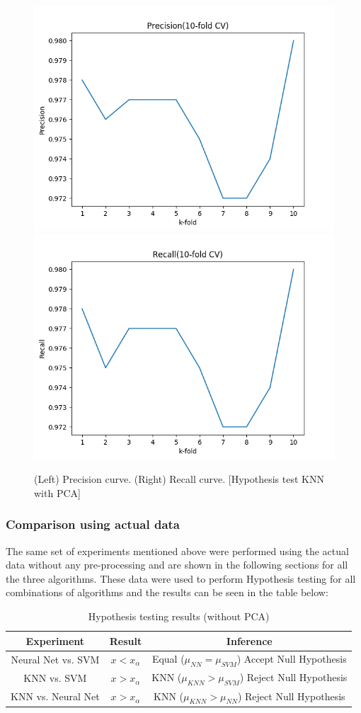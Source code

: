 \documentclass[10pt]{scrartcl}
\begin{document}
\begin{itemize}
\begin{figure}[H]
\centering
\includegraphics[width=0.45\linewidth]{figures/precision_knn.png} 
\includegraphics[width=0.45\linewidth]{figures/recall_knn.png}
\caption{(Left) Precision curve. (Right) Recall curve. [Hypothesis test KNN with PCA] \label{fig:hypo_pca_knn_pre_recl}}
\end{figure}

\end{itemize}

\subsubsection*{Comparison using actual data}

The same set of experiments mentioned above were performed using the actual data without any pre-processing and are shown in the following sections for all the three algorithms. These data were used to perform Hypothesis testing for all combinations of algorithms and the results can be seen in the table below:

\begin{table}[H] 
\centering
\begin{tabular}{ c|c|c }
 \textbf{Experiment} & \textbf{Result} & \textbf{Inference} \\ 
 \hline
Neural Net vs. SVM & $x < x_{\alpha}$ & Equal ($\mu_{NN} = \mu_{SVM}$) Accept Null Hypothesis\\ 
KNN vs. SVM & $x > x_{\alpha}$ &  KNN ($\mu_{KNN} > \mu_{SVM}$) Reject Null Hypothesis\\ 
KNN vs. Neural Net & $x > x_{\alpha}$ &  KNN ($\mu_{KNN} > \mu_{NN}$) Reject Null Hypothesis \\
\end{tabular}
\caption{Hypothesis testing results (without PCA) \label{tab:hypo_test_actual}}
\end{table}
\end{document}
